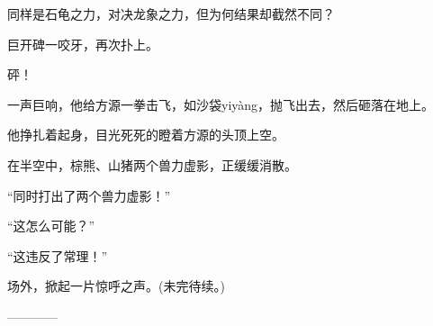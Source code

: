 \begin{this_body}
同样是石龟之力，对决龙象之力，但为何结果却截然不同？

巨开碑一咬牙，再次扑上。

砰！

一声巨响，他给方源一拳击飞，如沙袋yiyàng，抛飞出去，然后砸落在地上。

他挣扎着起身，目光死死的瞪着方源的头顶上空。

在半空中，棕熊、山猪两个兽力虚影，正缓缓消散。

“同时打出了两个兽力虚影！”

“这怎么可能？”

“这违反了常理！”

场外，掀起一片惊呼之声。(未完待续。)

------------

\end{this_body}

